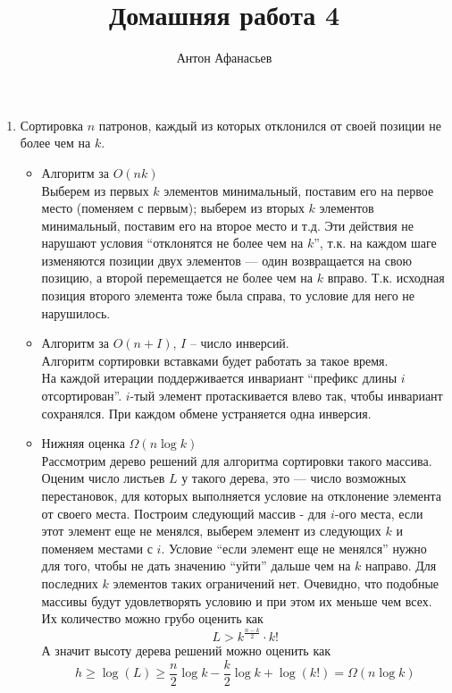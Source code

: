 \documentclass[10pt]{article}
\begin{document}
\title{Домашняя работа 4}
\author{Антон Афанасьев}
\maketitle

\begin{enumerate}
	\item Сортировка $n$ патронов, каждый из которых отклонился от своей позиции не более чем на $k$.
	
	\begin{itemize}
		\item Алгоритм за $O(nk)$\\
		Выберем из первых $k$ элементов минимальный, поставим его на первое место (поменяем с первым); выберем из вторых $k$ элементов минимальный, поставим его на второе место и т.д. Эти действия не нарушают условия ``отклонятся не более чем на $k$'', т.к. на каждом шаге изменяются позиции двух элементов --- один возвращается на свою позицию, а второй перемещается не более чем на $k$ вправо. Т.к. исходная позиция второго элемента тоже была справа, то условие для него не нарушилось.
		\item Алгоритм за $O(n+I)$, $I$ -- число инверсий.\\
		Алгоритм сортировки вставками будет работать за такое время.\\
		На каждой итерации поддерживается инвариант ``префикс длины $i$ отсортирован''. $i$-тый элемент протаскивается влево так, чтобы инвариант сохранялся. При каждом обмене устраняется одна инверсия.
		
		\item Нижняя оценка $\Omega(n \log k)$ \\
		Рассмотрим дерево решений для алгоритма сортировки такого массива. Оценим число листьев $L$ у такого дерева, это --- число возможных перестановок, для которых выполняется условие на отклонение элемента от своего места. Построим следующий массив - для $i$-ого места, если этот элемент еще не менялся, выберем элемент из следующих $k$ и поменяем местами с $i$. Условие ``если элемент еще не менялся'' нужно для того, чтобы не дать значению ``уйти'' дальше чем на $k$ направо. Для последних $k$ элементов таких ограничений нет. Очевидно, что подобные массивы будут удовлетворять условию и при этом их меньше чем всех. Их количество можно грубо оценить как\\
		$$L > k^{\frac{n-k}{2}} \cdot k!$$
		А значит высоту дерева решений можно оценить как
		$$h \ge \log(L) \ge \frac{n}{2} \log k - \frac{k}{2} \log k + \log (k!) = \Omega(n \log k)$$


\end{itemize}
\end{enumerate}
\end{document}
